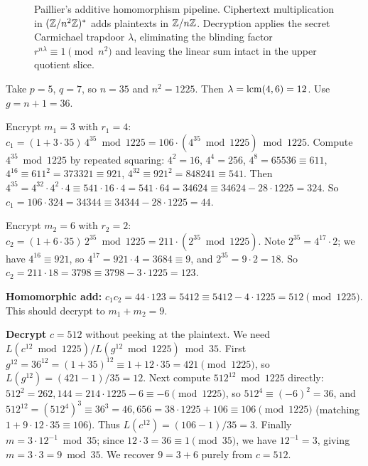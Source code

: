 \begin{figure}[H]
\caption{Paillier's additive homomorphism pipeline. Ciphertext multiplication in $(\mathbb{Z}/n^2\mathbb{Z})^{*}$ adds plaintexts in $\mathbb{Z}/n\mathbb{Z}$. Decryption applies the secret Carmichael trapdoor $\lambda$, eliminating the blinding factor $r^{n\lambda} \equiv 1 \pmod{n^2}$ and leaving the linear sum intact in the upper quotient slice.}
\label{ch33:fig-paillier-add}
\end{figure}

\begin{example}
\label{ch33:paillier-example}
Take $p=5$, $q=7$, so $n=35$ and $n^2 = 1225$. Then $\lambda = \operatorname{lcm}(4,6) = 12$. Use $g = n+1 = 36$.

Encrypt $m_1 = 3$ with $r_1 = 4$: $c_1 = (1+3\cdot 35)\,4^{35} \bmod 1225 = 106 \cdot (4^{35}\bmod 1225) \bmod 1225$. Compute $4^{35}\bmod 1225$ by repeated squaring: $4^2=16$, $4^4 = 256$, $4^8 = 65536 \equiv 611$, $4^{16}\equiv 611^2 = 373321 \equiv 921$, $4^{32}\equiv 921^2 = 848241 \equiv 541$. Then $4^{35} = 4^{32}\cdot 4^2\cdot 4 \equiv 541\cdot 16\cdot 4 = 541\cdot 64 = 34624 \equiv 34624 - 28\cdot 1225 = 324$. So $c_1 = 106\cdot 324 = 34344 \equiv 34344 - 28\cdot 1225 = 44$.

Encrypt $m_2 = 6$ with $r_2 = 2$: $c_2 = (1+6\cdot 35)\,2^{35}\bmod 1225 = 211\cdot(2^{35}\bmod 1225)$. Note $2^{35} = 4^{17}\cdot 2$; we have $4^{16}\equiv 921$, so $4^{17} = 921\cdot 4 = 3684 \equiv 9$, and $2^{35} = 9\cdot 2 = 18$. So $c_2 = 211\cdot 18 = 3798 \equiv 3798 - 3\cdot 1225 = 123$.

\textbf{Homomorphic add:} $c_1 c_2 = 44\cdot 123 = 5412 \equiv 5412 - 4\cdot 1225 = 512 \pmod{1225}$. This should decrypt to $m_1 + m_2 = 9$.

\textbf{Decrypt} $c = 512$ without peeking at the plaintext. We need $L(c^{12}\bmod 1225)/L(g^{12}\bmod 1225) \bmod 35$. First $g^{12} = 36^{12} = (1+35)^{12}\equiv 1 + 12\cdot 35 = 421 \pmod{1225}$, so $L(g^{12}) = (421-1)/35 = 12$. Next compute $512^{12}\bmod 1225$ directly: $512^2 = 262{,}144 = 214\cdot 1225 - 6 \equiv -6 \pmod{1225}$, so $512^4 \equiv (-6)^2 = 36$, and $512^{12} = (512^4)^3 \equiv 36^3 = 46{,}656 = 38\cdot 1225 + 106 \equiv 106 \pmod{1225}$ (matching $1 + 9\cdot 12\cdot 35 \equiv 106$). Thus $L(c^{12}) = (106-1)/35 = 3$. Finally $m = 3 \cdot 12^{-1} \bmod 35$; since $12\cdot 3 = 36\equiv 1 \pmod{35}$, we have $12^{-1} = 3$, giving $m = 3\cdot 3 = 9 \bmod 35$. We recover $9 = 3+6$ purely from $c = 512$.
\end{example}


